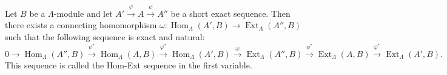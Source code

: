 Let $B$ be a $\Lambda$-module and let $A' \xrightarrow{\varphi} A \xrightarrow{\psi} A''$ be a short exact sequence. Then there exists a connecting homomorphism $\omega : \operatorname{Hom}_\Lambda(A', B) \to \operatorname{Ext}_\Lambda(A'', B)$ such that the following sequence is exact and natural:
$$
0 \to \operatorname{Hom}_\Lambda(A'', B) \xrightarrow{\psi^*} \operatorname{Hom}_\Lambda(A, B) \xrightarrow{\varphi^*} \operatorname{Hom}_\Lambda(A', B) \xrightarrow{\omega} \operatorname{Ext}_\Lambda(A'', B) \xrightarrow{\psi^*} \operatorname{Ext}_\Lambda(A, B) \xrightarrow{\varphi^*} \operatorname{Ext}_\Lambda(A', B).
$$
This sequence is called the Hom-Ext sequence in the first variable.
